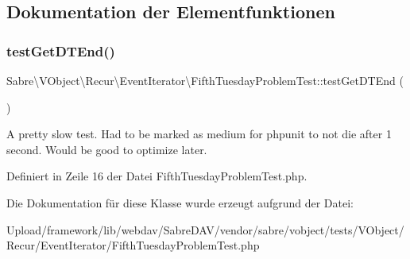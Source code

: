 \subsection{Dokumentation der Elementfunktionen}
\mbox{\label{class_sabre_1_1_v_object_1_1_recur_1_1_event_iterator_1_1_fifth_tuesday_problem_test_afc9f722159d8e88547746d16793c119b}} 
\subsubsection{\texorpdfstring{test\+Get\+D\+T\+End()}{testGetDTEnd()}}
{\footnotesize\ttfamily Sabre\textbackslash{}\+V\+Object\textbackslash{}\+Recur\textbackslash{}\+Event\+Iterator\textbackslash{}\+Fifth\+Tuesday\+Problem\+Test\+::test\+Get\+D\+T\+End (\begin{DoxyParamCaption}{ }\end{DoxyParamCaption})}

A pretty slow test. Had to be marked as \textquotesingle{}medium\textquotesingle{} for phpunit to not die after 1 second. Would be good to optimize later.

Definiert in Zeile 16 der Datei Fifth\+Tuesday\+Problem\+Test.\+php.



Die Dokumentation für diese Klasse wurde erzeugt aufgrund der Datei\+:\begin{DoxyCompactItemize}
\item 
Upload/framework/lib/webdav/\+Sabre\+D\+A\+V/vendor/sabre/vobject/tests/\+V\+Object/\+Recur/\+Event\+Iterator/Fifth\+Tuesday\+Problem\+Test.\+php\end{DoxyCompactItemize}
